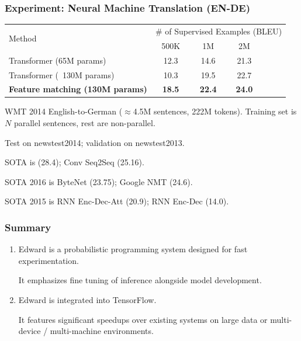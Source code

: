 \documentclass[10pt,
               xcolor={usenames,dvipsnames},
               hyperref={colorlinks,linktoc=all,citecolor=Plum,linkcolor=MidnightBlue,urlcolor=MidnightBlue},noamssymb]{beamer}
\begin{document}
\begin{frame}
\frametitle{Experiment: Neural Machine Translation (EN-DE)}

\begin{table}
\begin{center}
\begin{tabular}{lccccc}
\toprule
\multirow{2}{*}{Method} &
  \multicolumn{5}{c}{\# of Supervised Examples (BLEU)} \\
  & 500K & 1M & 2M \\
\toprule
Transformer (65M params) &
12.3 & 14.6 & 21.3 \\
Transformer (~130M params) &
10.3 & 19.5 & 22.7 \\
\bf Feature matching (130M params) &
\bf 18.5 &\bf 22.4 &\bf 24.0 \\
\bottomrule
\end{tabular}
\end{center}
\end{table}
\vspace{1ex}

WMT 2014 English-to-German ($\approx$4.5M sentences, 222M tokens).
Training set is $N$ parallel sentences, rest are non-parallel.

Test on newstest2014; validation on newstest2013.

SOTA is \gray{[Vaswani+ 2017]} (28.4);
Conv Seq2Seq (25.16).

SOTA 2016 is ByteNet (23.75);
Google NMT (24.6).

SOTA 2015 is RNN Enc-Dec-Att (20.9); RNN Enc-Dec (14.0).

\end{frame}

\begin{frame}[c]
\frametitle{Summary}
\begin{enumerate}
\item
Edward is a probabilistic programming system designed for fast
experimentation.

It emphasizes fine tuning of inference alongside model development.
\item
Edward is integrated into TensorFlow.

It features significant speedups over existing systems on large data
or multi-device / multi-machine environments.
\end{enumerate}
\end{frame}
\end{document}
